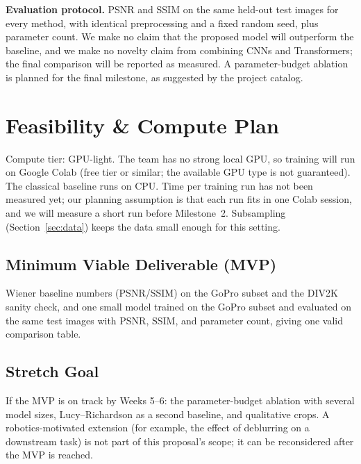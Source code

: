 \documentclass[11pt]{article}
\begin{document}
\textbf{Evaluation protocol.} PSNR and SSIM on the same held-out test images for every method,
with identical preprocessing and a fixed random seed, plus parameter count. We make no
claim that the proposed model will outperform the baseline, and we make no novelty
claim from combining CNNs and Transformers; the final comparison will be reported as
measured. A parameter-budget ablation is planned for the final milestone, as suggested
by the project catalog.

\section{Feasibility \& Compute Plan}
\label{sec:feasibility}
Compute tier: GPU-light. The team has no strong local GPU, so training will run on Google
Colab (free tier or similar; the available GPU type is not guaranteed). The classical
baseline runs on CPU. Time per training run has not been measured yet; our planning assumption is that each run fits in
one Colab session, and we will measure a short run before Milestone~2.
Subsampling (Section~\ref{sec:data}) keeps the data small enough for this setting.

\subsection{Minimum Viable Deliverable (MVP)}
Wiener baseline numbers (PSNR/SSIM) on the GoPro subset and the DIV2K sanity check, and one
small model trained on the GoPro subset and evaluated on the same test images with PSNR,
SSIM, and parameter count, giving one valid comparison table.

\subsection{Stretch Goal}
If the MVP is on track by Weeks 5--6: the parameter-budget ablation with several model
sizes, Lucy--Richardson as a second baseline, and qualitative crops.
A robotics-motivated extension (for example, the effect of deblurring on a downstream task) is not part of this proposal's scope; it can be reconsidered after the MVP is reached.
\end{document}
